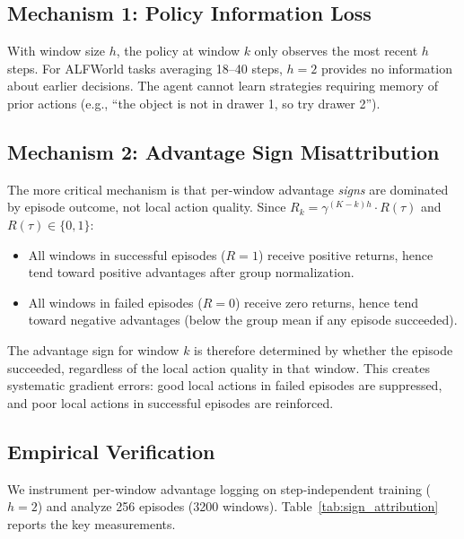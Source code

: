 \documentclass[11pt]{article}
\begin{document}
\subsection{Mechanism 1: Policy Information Loss}

With window size $h$, the policy at window $k$ only observes the most recent $h$ steps. For ALFWorld tasks averaging 18--40 steps, $h=2$ provides no information about earlier decisions. The agent cannot learn strategies requiring memory of prior actions (e.g., ``the object is not in drawer 1, so try drawer 2'').

\subsection{Mechanism 2: Advantage Sign Misattribution}

The more critical mechanism is that per-window advantage \emph{signs} are dominated by episode outcome, not local action quality. Since $R_k = \gamma^{(K-k)h} \cdot R(\tau)$ and $R(\tau) \in \{0, 1\}$:
\begin{itemize}
    \item All windows in successful episodes ($R=1$) receive positive returns, hence tend toward positive advantages after group normalization.
    \item All windows in failed episodes ($R=0$) receive zero returns, hence tend toward negative advantages (below the group mean if any episode succeeded).
\end{itemize}

The advantage sign for window $k$ is therefore determined by whether the episode succeeded, regardless of the local action quality in that window. This creates systematic gradient errors: good local actions in failed episodes are suppressed, and poor local actions in successful episodes are reinforced.

\subsection{Empirical Verification}
\label{sec:empirical_verification}

We instrument per-window advantage logging on step-independent training ($h=2$) and analyze 256 episodes (3200 windows). Table~\ref{tab:sign_attribution} reports the key measurements.
\end{document}
